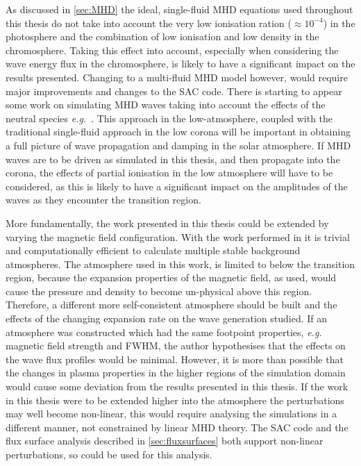 \documentclass[a4paper,12pt,fourier,authoryear,custommargin]{Classes/PhDThesisPSnPDF}
\begin{document}
As discussed in \cref{sec:MHD} the ideal, single-fluid MHD equations used throughout this thesis do not take into account the very low ionisation ration ($\approx 10^{-4}$) in the photosphere and the combination of low ionisation and low density in the chromosphere.
Taking this effect into account, especially when considering the wave energy flux in the chromosphere, is likely to have a significant impact on the results presented.
Changing to a multi-fluid MHD model however, would require major improvements and changes to the SAC code.
There is starting to appear some work on simulating MHD waves taking into account the effects of the neutral species \emph{e.g.}~\cite{shelyag2016}.
This approach in the low-atmosphere, coupled with the traditional single-fluid approach in the low corona will be important in obtaining a full picture of wave propagation and damping in the solar atmosphere.
If MHD waves are to be driven as simulated in this thesis, and then propagate into the corona, the effects of partial ionisation in the low atmosphere will have to be considered, as this is likely to have a significant impact on the amplitudes of the waves as they encounter the transition region.

More fundamentally, the work presented in this thesis could be extended by varying the magnetic field configuration.
With the work performed in \cite{gent2013,gent2014} it is trivial and computationally efficient to calculate multiple stable background atmospheres.
The atmosphere used in this work, is limited to below the transition region, because the expansion properties of the magnetic field, as used, would cause the pressure and density to become un-physical above this region.
Therefore, a different more self-consistent atmosphere should be built and the effects of the changing expansion rate on the wave generation studied.
If an atmosphere was constructed which had the same footpoint properties, \textit{e.g.} magnetic field strength and FWHM, the author hypothesises that the effects on the wave flux profiles would be minimal.
However, it is more than possible that the changes in plasma properties in the higher regions of the simulation domain would cause some deviation from the results presented in this thesis.
If the work in this thesis were to be extended higher into the atmosphere the perturbations may well become non-linear, this would require analysing the simulations in a different manner, not constrained by linear MHD theory.
The SAC code and the flux surface analysis described in \cref{sec:fluxsurfaces} both support non-linear perturbations, so could be used for this analysis.
\end{document}
